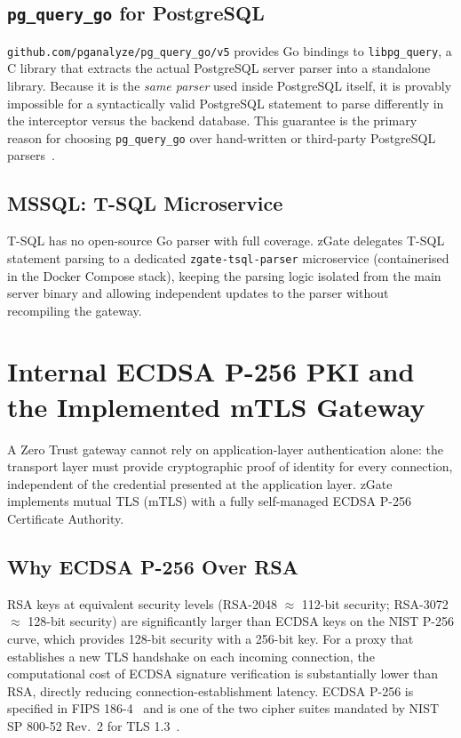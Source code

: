\subsection{\texttt{pg\_query\_go} for PostgreSQL}

\texttt{github.com/pganalyze/pg\_query\_go/v5} provides Go bindings to \texttt{libpg\_query}, a C library that extracts the actual PostgreSQL server parser into a standalone library. Because it is the \emph{same parser} used inside PostgreSQL itself, it is provably impossible for a syntactically valid PostgreSQL statement to parse differently in the interceptor versus the backend database. This guarantee is the primary reason for choosing \texttt{pg\_query\_go} over hand-written or third-party PostgreSQL parsers~\cite{pganalyze-parser}.

\subsection{MSSQL: T-SQL Microservice}

T-SQL has no open-source Go parser with full coverage. zGate delegates T-SQL statement parsing to a dedicated \texttt{zgate-tsql-parser} microservice (containerised in the Docker Compose stack), keeping the parsing logic isolated from the main server binary and allowing independent updates to the parser without recompiling the gateway.

\section{Internal ECDSA P-256 PKI and the Implemented mTLS Gateway}
\label{sec:pki-mtls}

A Zero Trust gateway cannot rely on application-layer authentication alone: the transport layer must provide cryptographic proof of identity for every connection, independent of the credential presented at the application layer. zGate implements mutual TLS (mTLS) with a fully self-managed ECDSA P-256 Certificate Authority.

\subsection{Why ECDSA P-256 Over RSA}

RSA keys at equivalent security levels (RSA-2048 $\approx$ 112-bit security; RSA-3072 $\approx$ 128-bit security) are significantly larger than ECDSA keys on the NIST P-256 curve, which provides 128-bit security with a 256-bit key. For a proxy that establishes a new TLS handshake on each incoming connection, the computational cost of ECDSA signature verification is substantially lower than RSA, directly reducing connection-establishment latency. ECDSA P-256 is specified in FIPS 186-4~\cite{fips-186-4} and is one of the two cipher suites mandated by NIST SP 800-52 Rev.\ 2 for TLS 1.3~\cite{nist-tls}.

